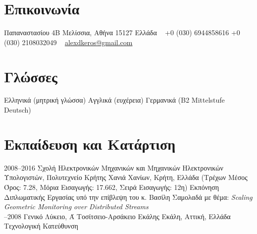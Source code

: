 \documentclass[print]{keros-cv} %
\begin{document}


\begin{aside} %
\section{Επικοινωνία}
Παπαναστασίου 4Β
Μελίσσια, Αθήνα 15127
Ελλάδα
~
+0 (030) 6944858616
+0 (030) 2108032049
~
\href{mailto:alexdkeros@gmail.com}{alexdkeros@gmail.com}
\section{Γλώσσες}
Ελληνικά (μητρική γλώσσα)
Αγγλικά (ευχέρεια)
Γερμανικά (B2 Mittelstufe Deutsch)
\end{aside}


\section{Εκπαίδευση και Κατάρτιση}

\begin{entrylist}
\entry
{2008--2016}
{Σχολή Ηλεκτρονικών Μηχανικών και Μηχανικών Ηλεκτρονικών Υπολογιστών, Πολυτεχνείο Κρήτης}
{Χανιά Χανίων, Κρήτη, Ελλάδα}
{(Τρέχων Μέσος Όρος: 7.28, Μόρια Εισαγωγής: 17.662, Σειρά Εισαγωγής: 12η)
Εκπόνηση Διπλωματικής Εργασίας υπό την επίβλεψη του κ. Βασίλη Σαμολαδά με θέμα: \emph{Scaling Geometric Monitoring over Distributed Streams}\\}
\entry
{--2008}
{Γενικό Λύκειο, Ά Τοσίτσειο-Αρσάκειο Εκάλης}
{Εκάλη, Αττική, Ελλάδα}
{Τεχνολογική Κατεύθυνση}
\end{entrylist}

\end{document}
